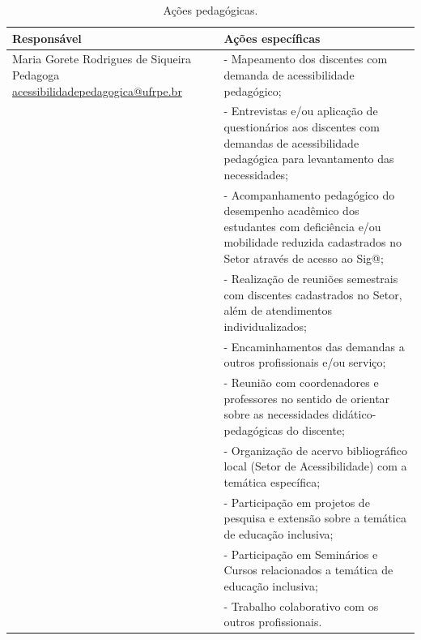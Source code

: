 \documentclass[
	12pt,				%
	openright,			%
  oneside,     %
	a4paper,			%
	chapter=TITLE,		%
	english,			%
	french,				%
	spanish,			%
	brazil				%
	]{abntex2}
\begin{document}
\begin{center}
  
  \begin{scriptsize}
    \begin{longtable}{p{5cm}p{9cm}}
      \caption{\label{quadro:acoes-pedagogicas}Ações pedagógicas.}\\
      \toprule
      \textbf{Responsável} & \textbf{Ações específicas}\\ 
        \midrule
        Maria Gorete Rodrigues de Siqueira \newline Pedagoga \newline \href{mailto:acessibilidadepedagogica@ufrpe.br}{acessibilidadepedagogica@ufrpe.br} 
        & - Mapeamento dos discentes com demanda de acessibilidade pedagógico;\\
        & - Entrevistas e/ou aplicação de questionários aos discentes com demandas de acessibilidade pedagógica para levantamento das necessidades;\\
        \addlinespace
        & - Acompanhamento pedagógico do desempenho acadêmico dos estudantes com deficiência e/ou mobilidade reduzida cadastrados no Setor através de acesso ao Sig@;\\
        \addlinespace
        & - Realização de reuniões semestrais com discentes cadastrados no Setor, além de atendimentos individualizados;\\
        \addlinespace
        & - Encaminhamentos das demandas a outros profissionais e/ou serviço;\\
        \addlinespace
        & - Reunião com coordenadores e professores no sentido de orientar sobre as necessidades didático-pedagógicas do discente;\\
        \addlinespace
        & - Organização de acervo bibliográfico local (Setor de Acessibilidade) com a temática específica;\\
        \addlinespace
        & - Participação em projetos de pesquisa e extensão sobre a temática de educação inclusiva;	\\
        \addlinespace
        & - Participação em Seminários e Cursos relacionados a temática de educação inclusiva;		\\
        \addlinespace
        & - Trabalho colaborativo com os outros profissionais.\\
        
      \bottomrule
\end{longtable}
\end{scriptsize}      
\end{center}
\end{document}
